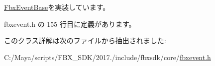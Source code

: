 \hyperlink{class_fbx_event_base_ac7a558ec38bc899bd705786620582b8b}{Fbx\+Event\+Base}を実装しています。



 fbxevent.\+h の 155 行目に定義があります。



このクラス詳解は次のファイルから抽出されました\+:\begin{DoxyCompactItemize}
\item 
C\+:/\+Maya/scripts/\+F\+B\+X\+\_\+\+S\+D\+K/2017./include/fbxsdk/core/\hyperlink{fbxevent_8h}{fbxevent.\+h}\end{DoxyCompactItemize}
